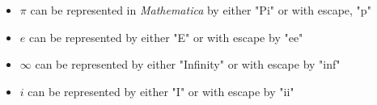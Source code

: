 \documentclass[11pt,letterpaper,twoside,titlepage]{report}
\newcommand{\Mathematica}{\textit{Mathematica} }
\begin{document}
			\begin{itemize}
				
				\item %
					
					$ \pi $ can be represented in \Mathematica by either "Pi" or with escape, "p"
					
				\item %
					
					$ e $ can be represented by either "E" or with escape by "ee"
						
				\item %
					
					$ \infty $ can be represented by either "Infinity" or with escape by "inf"
						
				\item %
					
					$ i $ can be represented by either "I" or with escape by "ii"
				
			\end{itemize}
			
%		

%				
%				
%						
%					
%						
%					
%						
%					
%						
%					
%						
%					
%				
			
\end{document}
